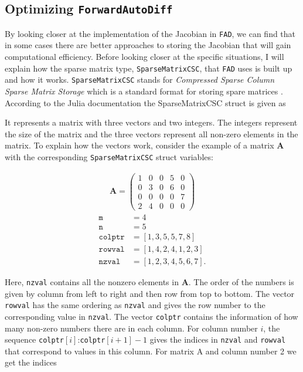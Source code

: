 \subsection{Optimizing \texttt{ForwardAutoDiff}}
By looking closer at the implementation of the Jacobian in \texttt{FAD}, we can find that in some cases there are better approaches to storing the Jacobian that will gain computational efficiency. Before looking closer at the specific situations, I will explain how the sparse matrix type, \texttt{SparseMatrixCSC}, that \texttt{FAD} uses is built up and how it works. \texttt{SparseMatrixCSC} stands for \textit{Compressed Sparse Column Sparse Matrix Storage} which is a standard format for storing spare matrices \emph{\citep{doi:10.1137/1.9780898718003.ch3}}. According to the Julia documentation \emph{\citep{SparseMatrixCSC}} the SparseMatrixCSC struct is given as

It represents a matrix with three vectors and two integers. The integers represent the size of the matrix and the three vectors represent all non-zero elements in the matrix. To explain how the vectors work, consider the example of a matrix \textbf{A} with the corresponding \texttt{SparseMatrixCSC} struct variables:
\begin{multicols}{2}
    \begin{align*}
        \textbf{A} = \begin{pmatrix}
        1&0&0&5&0\\
        0&3&0&6&0\\
        0&0&0&0&7\\
        2&4&0&0&0\end{pmatrix}
    \end{align*}
    \columnbreak
    \begin{align*}
        \texttt{m} &= 4\\
        \texttt{n} &= 5\\
        \texttt{colptr} &= [1, 3, 5, 5, 7, 8]\\
        \texttt{rowval} &= [1, 4, 2, 4, 1, 2, 3]\\
        \texttt{nzval} &= [1, 2, 3, 4, 5, 6, 7].
    \end{align*}
\end{multicols}
Here, \texttt{nzval} contains all the nonzero elements in \textbf{A}. The order of the numbers is given by column from left to right and then row from top to bottom. The vector \texttt{rowval} has the same ordering as \texttt{nzval} and gives the row number to the corresponding value in \texttt{nzval}. The vector \texttt{colptr} contains the information of how many non-zero numbers there are in each column. For column number $i$, the sequence \texttt{colptr}$[i]$:\texttt{colptr}$[i+1]-1$ gives the indices in \texttt{nzval} and \texttt{rowval} that correspond to values in this column. For matrix A and column number 2 we get the indices
